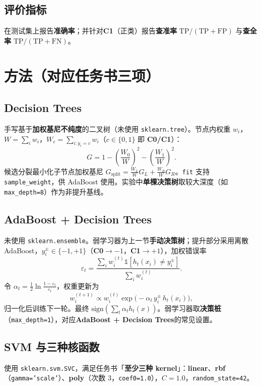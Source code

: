 \documentclass[UTF8,a4paper,11pt]{ctexart}
\begin{document}
\subsection{评价指标}
在测试集上报告\textbf{准确率}；并针对\textbf{C1}（正类）报告\textbf{查准率} $\mathrm{TP}/(\mathrm{TP}+\mathrm{FP})$ 与\textbf{查全率} $\mathrm{TP}/(\mathrm{TP}+\mathrm{FN})$。

\section{方法（对应任务书三项）}
\subsection{Decision Trees}
手写基于\textbf{加权基尼不纯度}的二叉树（未使用 \texttt{sklearn.tree}）。节点内权重 $w_i$，$W=\sum_i w_i$，$W_c=\sum_{i:y_i=c} w_i$（$c\in\{0,1\}$ 即 \textbf{C0/C1}）：
\begin{equation}
  G = 1 - \left(\frac{W_0}{W}\right)^2 - \left(\frac{W_1}{W}\right)^2.
\end{equation}
候选分裂最小化子节点加权基尼 $G_{\mathrm{split}} = \frac{W_L}{W} G_L + \frac{W_R}{W} G_R$。\texttt{fit} 支持 \texttt{sample\_weight}，供 AdaBoost 使用。实验中\textbf{单棵决策树}取较大深度（如 \texttt{max\_depth=8}）作为非提升基线。

\subsection{AdaBoost + Decision Trees}
未使用 \texttt{sklearn.ensemble}。弱学习器为上一节\textbf{手动决策树}；提升部分采用离散 AdaBoost，$y_i^{\pm}\in\{-1,+1\}$（\textbf{C0}$\to -1$，\textbf{C1}$\to +1$），加权错误率
\begin{equation}
  \varepsilon_t = \frac{\sum_i w_i^{(t)} \mathbb{1}[h_t(x_i) \neq y_i^{\pm}]}{\sum_i w_i^{(t)}}.
\end{equation}
令 $\alpha_t = \frac{1}{2}\ln\frac{1-\varepsilon_t}{\varepsilon_t}$，权重更新为
\begin{equation}
  \label{eq:boost-weights}
  w_i^{(t+1)} \propto w_i^{(t)} \exp\bigl(-\alpha_t\, y_i^{\pm}\, h_t(x_i)\bigr),
\end{equation}
归一化后训练下一轮。最终 $\mathrm{sign}(\sum_t \alpha_t h_t(x))$。弱学习器取\textbf{决策桩}（\texttt{max\_depth=1}），对应\textbf{AdaBoost + Decision Trees}的常见设置。

\subsection{SVM 与三种核函数}
使用 \texttt{sklearn.svm.SVC}，满足任务书「\textbf{至少三种 kernel}」：\textbf{linear}、\textbf{rbf}（\texttt{gamma='scale'}）、\textbf{poly}（次数 3，\texttt{coef0=1.0}），$C=1.0$，\texttt{random\_state=42}。
\end{document}
